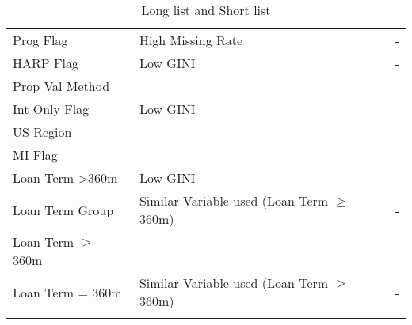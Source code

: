\begin{longtable}{ l p{5.5cm} p{5.5cm} }
Prog Flag                   & \cellcolor[HTML]{EDA8A0}High Missing Rate                                                                     & -                                                                                                  \\
HARP Flag                   & \cellcolor[HTML]{EDA8A0}Low GINI                                                                              & -                                                                                                  \\
Prop Val Method             & \cellcolor[HTML]{B4EDB3}                                                                                      & \cellcolor[HTML]{B4EDB3}                                                                           \\
Int Only Flag               & \cellcolor[HTML]{EDA8A0}Low GINI                                                                              & -                                                                                                  \\
US Region                   & \cellcolor[HTML]{B4EDB3}                                                                                      & \cellcolor[HTML]{B4EDB3}                                                                           \\
MI Flag                     & \cellcolor[HTML]{B4EDB3}                                                                                      & \cellcolor[HTML]{B4EDB3}                                                                           \\
Loan Term \textgreater 360m & \cellcolor[HTML]{EDA8A0}Low GINI                                                                              & -                                                                                                  \\
Loan Term Group             & \cellcolor[HTML]{EDA8A0}Similar Variable used (Loan Term $\geq$ 360m)                                         & -                                                                                                  \\
Loan Term $\geq$ 360m       & \cellcolor[HTML]{B4EDB3}                                                                                      & \cellcolor[HTML]{B4EDB3}                                                                           \\
Loan Term = 360m            & \cellcolor[HTML]{EDA8A0}Similar Variable used (Loan Term $\geq$ 360m)                                         & -                                                                                               \\\bottomrule
\caption{Long list and Short list}
\label{tab:re_ll_sl}       
\end{longtable}

